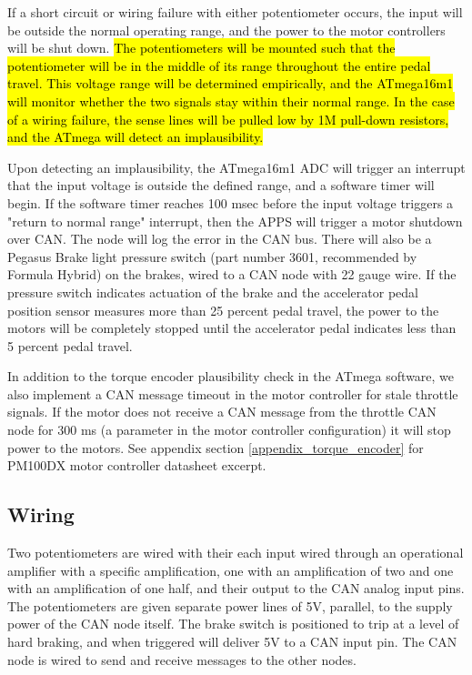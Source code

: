 \documentclass{article}
\begin{document}
If a short circuit or wiring failure with either potentiometer occurs, the input will be outside the normal operating range, and the power to the motor controllers will be shut down. \hl{The potentiometers will be mounted such that the potentiometer will be in the middle of its range throughout the entire pedal travel. This voltage range will be determined empirically, and the ATmega16m1 will monitor whether the two signals stay within their normal range. In the case of a wiring failure, the sense lines will be pulled low by 1M pull-down resistors, and the ATmega will detect an implausibility.}

Upon detecting an implausibility, the ATmega16m1 ADC will trigger an interrupt that the input voltage is outside the defined range, and a software timer will begin. If the software timer reaches 100 msec before the input voltage triggers a "return to normal range" interrupt, then the APPS will trigger a motor shutdown over CAN. The node will log the error in the CAN bus. There will also be a Pegasus Brake light pressure switch (part number 3601, recommended by Formula Hybrid) on the brakes, wired to a CAN node with 22 gauge wire. If the pressure switch indicates actuation of the brake and the accelerator pedal position sensor measures more than 25 percent pedal travel, the power to the motors will be completely stopped until the accelerator pedal indicates less than 5 percent pedal travel. 

In addition to the torque encoder plausibility check in the ATmega software, we also implement a CAN message timeout in the motor controller for stale throttle signals. If the motor does not receive a CAN message from the throttle CAN node for 300 ms (a parameter in the motor controller configuration) it will stop power to the motors. See appendix section \ref{appendix_torque_encoder} for PM100DX motor controller datasheet excerpt.

\subsection{Wiring}

Two potentiometers are wired with their each input wired through an operational amplifier with a specific amplification, one with an amplification of two and one with an amplification of one half, and their output to the CAN analog input pins. The potentiometers are given separate power lines of 5V, parallel, to the supply power of the CAN node itself. The brake switch is positioned to trip at a level of hard braking, and when triggered will deliver 5V to a CAN input pin. The CAN node is wired to send and receive messages to the other nodes.
\end{document}
